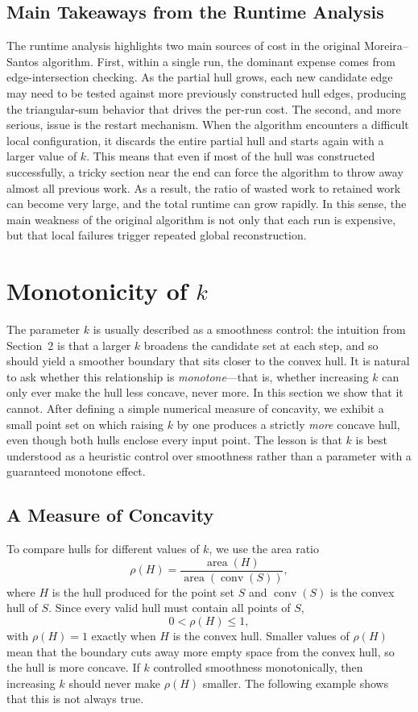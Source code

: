 \documentclass[10pt,twocolumn]{article}
\begin{document}
\subsection{Main Takeaways from the Runtime Analysis}
The runtime analysis highlights two main sources of cost in the original Moreira--Santos algorithm. First, within a single run, the dominant expense comes from edge-intersection checking. As the partial hull grows, each new candidate edge may need to be tested against more previously constructed hull edges, producing the triangular-sum behavior that drives the per-run cost.
The second, and more serious, issue is the restart mechanism. When the algorithm encounters a difficult local configuration, it discards the entire partial hull and starts again with a larger value of $k$. This means that even if most of the hull was constructed successfully, a tricky section near the end can force the algorithm to throw away almost all previous work. As a result, the ratio of wasted work to retained work can become very large, and the total runtime can grow rapidly. In this sense, the main weakness of the original algorithm is not only that each run is expensive, but that local failures trigger repeated global reconstruction.
\section{Monotonicity of $k$}
The parameter $k$ is usually described as a smoothness control: the intuition from Section~2 is that a larger $k$ broadens the candidate set at each step, and so should yield a smoother boundary that sits closer to the convex hull. It is natural to ask whether this relationship is \emph{monotone}---that is, whether increasing $k$ can only ever make the hull less concave, never more. In this section we show that it cannot. After defining a simple numerical measure of concavity, we exhibit a small point set on which raising $k$ by one produces a strictly \emph{more} concave hull, even though both hulls enclose every input point. The lesson is that $k$ is best understood as a heuristic control over smoothness rather than a parameter with a guaranteed monotone effect.


\subsection{A Measure of Concavity}
To compare hulls for different values of \(k\), we use the area ratio
\[
  \rho(H) = \frac{\operatorname{area}(H)}{\operatorname{area}(\operatorname{conv}(S))},
\]
where \(H\) is the hull produced for the point set \(S\) and \(\operatorname{conv}(S)\) is the convex hull of \(S\). Since every valid hull must contain all points of \(S\),
\[
  0 < \rho(H) \leq 1,
\]
with \(\rho(H) = 1\) exactly when \(H\) is the convex hull. Smaller values of \(\rho(H)\) mean that the boundary cuts away more empty space from the convex hull, so the hull is more concave. If $k$ controlled smoothness monotonically, then increasing $k$ should never make \(\rho(H)\) smaller. The following example shows that this is not always true.
\end{document}
